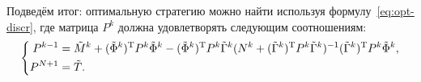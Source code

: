 Подведём итог: оптимальную стратегию можно найти используя формулу~\eqref{eq:opt-discr}, где матрица $P^k$ должна удовлетворять следующим соотношениям:
\begin{equation}\label{eq:disc-rikkati}
        \left\{
        \begin{aligned}
P^{k-1} &= \tilde M^k
+
(\tilde\Phi^k)^\mathrm{T} P^k \tilde\Phi^k-
(\tilde\Phi^k)^\mathrm{T} P^k \tilde\Gamma^k (N^k + (\tilde\Gamma^k)^\mathrm{T} P^k \tilde\Gamma^k)^{-1} (\tilde\Gamma^k)^\mathrm{T} P^k \tilde\Phi^k,\\
P^{N+1} &= \tilde T.
        \end{aligned}
        \right.
\end{equation}